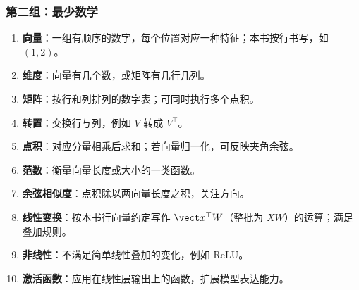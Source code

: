 \subsubsection{第二组：最少数学}
\begin{enumerate}[leftmargin=2.5em,itemsep=4pt,start=11]
\item \textbf{向量}：一组有顺序的数字，每个位置对应一种特征；本书按行书写，如 $(1,2)$。 
\item \textbf{维度}：向量有几个数，或矩阵有几行几列。 
\item \textbf{矩阵}：按行和列排列的数字表；可同时执行多个点积。 
\item \textbf{转置}：交换行与列，例如 $V$ 转成 $V^\top$。 
\item \textbf{点积}：对应分量相乘后求和；若向量归一化，可反映夹角余弦。 
\item \textbf{范数}：衡量向量长度或大小的一类函数。 
\item \textbf{余弦相似度}：点积除以两向量长度之积，关注方向。 
\item \textbf{线性变换}：按本书行向量约定写作 $\vect x^\top W$（整批为 $XW$）的运算；满足叠加规则。 
\item \textbf{非线性}：不满足简单线性叠加的变化，例如 ReLU。 
\item \textbf{激活函数}：应用在线性层输出上的函数，扩展模型表达能力。 
\end{enumerate}

